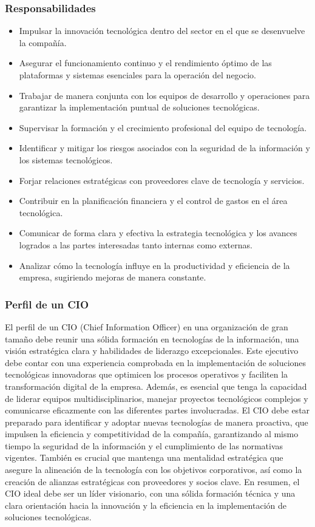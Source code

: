\subsubsection{Responsabilidades }
    \begin{itemize}
        \item Impulsar la innovación tecnológica dentro del sector en el que se desenvuelve la compañía. 
        \item Asegurar el funcionamiento continuo y el rendimiento óptimo de las plataformas y sistemas esenciales para la operación del negocio. 
        \item Trabajar de manera conjunta con los equipos de desarrollo y operaciones para garantizar la implementación puntual de soluciones tecnológicas. 
        \item Supervisar la formación y el crecimiento profesional del equipo de tecnología. 
        \item Identificar y mitigar los riesgos asociados con la seguridad de la información y los sistemas tecnológicos. 
        \item Forjar relaciones estratégicas con proveedores clave de tecnología y servicios. 
        \item Contribuir en la planificación financiera y el control de gastos en el área tecnológica. 
        \item Comunicar de forma clara y efectiva la estrategia tecnológica y los avances logrados a las partes interesadas tanto internas como externas. 
        \item Analizar cómo la tecnología influye en la productividad y eficiencia de la empresa, sugiriendo mejoras de manera constante. 
    \end{itemize}
\subsubsection{Perfil de un CIO}
El perfil de un CIO (Chief Information Officer) en una organización de gran tamaño debe reunir una sólida formación en tecnologías de la información, una visión estratégica clara y habilidades de liderazgo excepcionales. Este ejecutivo debe contar con una experiencia comprobada en la implementación de soluciones tecnológicas innovadoras que optimicen los procesos operativos y faciliten la transformación digital de la empresa. Además, es esencial que tenga la capacidad de liderar equipos multidisciplinarios, manejar proyectos tecnológicos complejos y comunicarse eficazmente con las diferentes partes involucradas. 
El CIO debe estar preparado para identificar y adoptar nuevas tecnologías de manera proactiva, que impulsen la eficiencia y competitividad de la compañía, garantizando al mismo tiempo la seguridad de la información y el cumplimiento de las normativas vigentes. También es crucial que mantenga una mentalidad estratégica que asegure la alineación de la tecnología con los objetivos corporativos, así como la creación de alianzas estratégicas con proveedores y socios clave. En resumen, el CIO ideal debe ser un líder visionario, con una sólida formación técnica y una clara orientación hacia la innovación y la eficiencia en la implementación de soluciones tecnológicas. 
